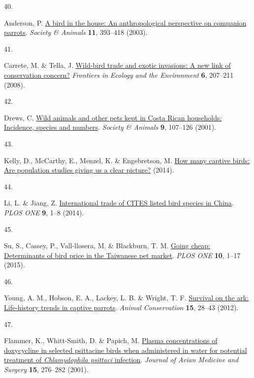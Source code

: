 \documentclass[
  man,floatsintext]{apa6}
\newlength{\cslhangindent}
\newlength{\csllabelwidth}
\newlength{\cslentryspacingunit} %
\newenvironment{CSLReferences}[2] %
 {%
  \setlength{\parindent}{0pt}
  \ifodd #1
  \let\oldpar\par
  \def\par{\hangindent=\cslhangindent\oldpar}
  \fi
  \setlength{\parskip}{#2\cslentryspacingunit}
 }%
 {}
\newcommand{\CSLLeftMargin}[1]{\parbox[t]{\csllabelwidth}{#1}}
\newcommand{\CSLRightInline}[1]{\parbox[t]{\linewidth - \csllabelwidth}{#1}\break}
\begin{document}
\begin{CSLReferences}{0}{0}
\leavevmode{}%
\CSLLeftMargin{40. }%
\CSLRightInline{Anderson, P. \href{https://doi.org/10.1163/156853003322796109}{A bird in the house: An anthropological perspective on companion parrots}. \emph{Society \& Animals} \textbf{11}, 393--418 (2003).}

\leavevmode{}%
\CSLLeftMargin{41. }%
\CSLRightInline{Carrete, M. \& Tella, J. \href{https://doi.org/10.1890/070075}{Wild-bird trade and exotic invasions: A new link of conservation concern?} \emph{Frontiers in Ecology and the Environment} \textbf{6}, 207--211 (2008).}

\leavevmode{}%
\CSLLeftMargin{42. }%
\CSLRightInline{Drews, C. \href{https://doi.org/10.1163/156853001753639233}{Wild animals and other pets kept in {C}osta {R}ican households: Incidence, species and numbers}. \emph{Society \& Animals} \textbf{9}, 107--126 (2001).}

\leavevmode{}%
\CSLLeftMargin{43. }%
\CSLRightInline{Kelly, D., McCarthy, E., Menzel, K. \& Engebretson, M. \href{https://www.avianwelfare.org/issues/overview.htm}{How many captive birds: Are population studies giving us a clear picture?} (2014).}

\leavevmode{}%
\CSLLeftMargin{44. }%
\CSLRightInline{Li, L. \& Jiang, Z. \href{https://doi.org/10.1371/journal.pone.0085012}{International trade of {CITES} listed bird species in {C}hina}. \emph{PLOS ONE} \textbf{9}, 1--8 (2014).}

\leavevmode{}%
\CSLLeftMargin{45. }%
\CSLRightInline{Su, S., Cassey, P., Vall-llosera, M. \& Blackburn, T. M. \href{https://doi.org/10.1371/journal.pone.0127482}{Going cheap: Determinants of bird price in the {T}aiwanese pet market}. \emph{PLOS ONE} \textbf{10}, 1--17 (2015).}

\leavevmode{}%
\CSLLeftMargin{46. }%
\CSLRightInline{Young, A. M., Hobson, E. A., Lackey, L. B. \& Wright, T. F. \href{https://doi.org/10.1111/j.1469-1795.2011.00477.x}{Survival on the ark: Life-history trends in captive parrots}. \emph{Animal Conservation} \textbf{15}, 28--43 (2012).}

\leavevmode{}%
\CSLLeftMargin{47. }%
\CSLRightInline{Flammer, K., Whitt-Smith, D. \& Papich, M. \href{https://doi.org/10.1647/1082-6742(2001)015\%5B0276:PCODIS\%5D2.0.CO;2}{Plasma concentrations of doxycycline in selected psittacine birds when administered in water for potential treatment of \emph{{C}hlamydophila psittaci} infection}. \emph{Journal of Avian Medicine and Surgery} \textbf{15}, 276--282 (2001).}


\end{CSLReferences}
\end{document}
